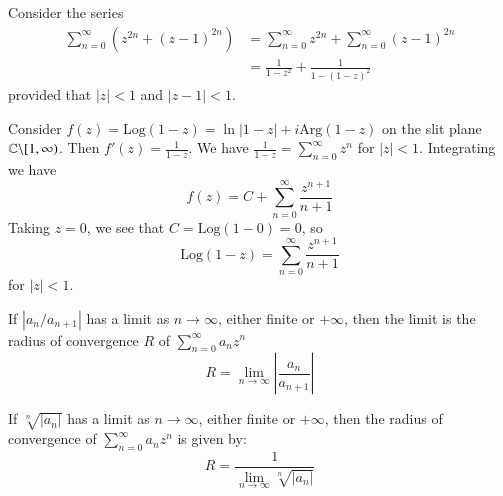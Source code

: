 \begin{example}
    Consider the series \begin{align*}
        \sum_{n=0}^{\infty}(z^{2n} + (z-1)^{2n}) &= \sum_{n=0}^{\infty}z^{2n} + \sum_{n=0}^{\infty}(z-1)^{2n} \\
        &= \frac{1}{1-z^2} + \frac{1}{1-(1-z)^2}
    \end{align*}
    provided that $|z| < 1$ and $|z-1| < 1$.
\end{example}

\begin{example}
    Consider $f(z) = \text{Log}(1-z) = \ln|1-z| + i\text{Arg}(1-z)$ on the slit plane $\mathbb C\backslash[1,\infty)$. Then $f'(z) = \frac{1}{1-z}$. We have $\frac{1}{1-z} = \sum_{n=0}^{\infty}z^n$ for $|z| < 1$. Integrating we have \begin{equation*}
        f(z) = C+\sum_{n=0}^{\infty}\frac{z^{n+1}}{n+1}
    \end{equation*}
    Taking $z = 0$, we see that $C = \text{Log}(1-0) = 0$, so \begin{equation*}
        \text{Log}(1-z) = \sum_{n=0}^{\infty}\frac{z^{n+1}}{n+1}
    \end{equation*}
    for $|z| < 1$.
\end{example}


\begin{theorem}
    If $|a_n/a_{n+1}|$ has a limit as $n\rightarrow \infty$, either finite or $+\infty$, then the limit is the radius of convergence $R$ of $\sum_{n=0}^{\infty}a_nz^n$ \begin{equation*}
        R = \lim\limits_{n\rightarrow \infty}\left|\frac{a_n}{a_{n+1}}\right|
    \end{equation*}
\end{theorem}

\begin{theorem}
    If $\sqrt[n]{|a_n|}$ has a limit as $n\rightarrow \infty$, either finite or $+\infty$, then the radius of convergence of $\sum_{n=0}^{\infty}a_nz^n$ is given by: \begin{equation*}
        R = \frac{1}{\lim\limits_{n\rightarrow \infty}\sqrt[n]{|a_n|}}
    \end{equation*}
\end{theorem}


